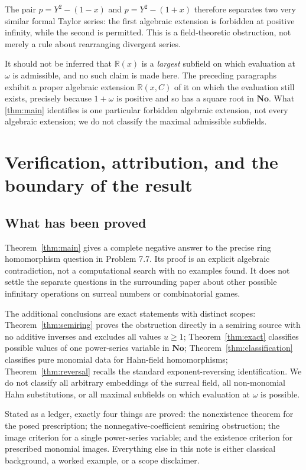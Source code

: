 \documentclass[11pt,letterpaper]{article}
\theoremstyle{definition}
\theoremstyle{remark}
\newcommand{\No}{\mathbf{No}}
\newcommand{\R}{\mathbb R}
\begin{document}
The pair $p=Y^2-(1-x)$ and $p=Y^2-(1+x)$ therefore separates two very similar
formal Taylor series: the first algebraic extension is forbidden at positive
infinity, while the second is permitted. This is a field-theoretic obstruction,
not merely a rule about rearranging divergent series.

It should not be inferred that $\R(x)$ is a \emph{largest} subfield on which
evaluation at $\omega$ is admissible, and no such claim is made here. The
preceding paragraphs exhibit a proper algebraic extension $\R(x,C)$ of it on
which the evaluation still exists, precisely because $1+\omega$ is positive
and so has a square root in $\No$. What \cref{thm:main} identifies is one
particular forbidden algebraic extension, not every algebraic extension; we do
not classify the maximal admissible subfields.

\section{Verification, attribution, and the boundary of the result}\label{sec:audit}

\subsection{What has been proved}
Theorem~\ref{thm:main} gives a complete negative answer to the precise ring
homomorphism question in Problem 7.7. Its proof is an explicit algebraic
contradiction, not a computational search with no examples found. It does not
settle the separate questions in the surrounding paper about other possible
infinitary operations on surreal numbers or combinatorial games.

The additional conclusions are exact statements with distinct scopes:
Theorem~\ref{thm:semiring} proves the obstruction directly in a semiring
source with no additive inverses and excludes all values $u\ge1$;
Theorem~\ref{thm:exact} classifies possible values of one power-series variable
in $\No$; Theorem~\ref{thm:classification} classifies pure monomial data for
Hahn-field homomorphisms; Theorem~\ref{thm:reversal} recalls the standard
exponent-reversing identification. We do not classify all arbitrary embeddings
of the surreal field, all non-monomial Hahn substitutions, or all maximal
subfields on which evaluation at $\omega$ is possible.

Stated as a ledger, exactly four things are proved: the nonexistence theorem
for the posed prescription; the nonnegative-coefficient semiring
obstruction; the image criterion for a single power-series variable; and the
existence criterion for prescribed monomial images. Everything else in this
note is either classical background, a worked example, or a scope
disclaimer.
\end{document}

